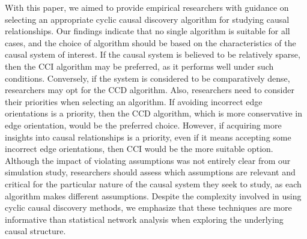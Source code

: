 \documentclass[twoside, 11pt]{article}
\begin{document}
With this paper, we aimed to provide empirical researchers with guidance on selecting an appropriate cyclic causal discovery algorithm for studying causal relationships. 
Our findings indicate that no single algorithm is suitable for all cases, and the choice of algorithm should be based on the characteristics of the causal system of interest. 
If the causal system is believed to be relatively sparse, then the CCI algorithm may be preferred, as it performs well under such conditions. Conversely, if the system is considered to be comparatively dense, researchers may opt for the CCD algorithm.
Also, researchers need to consider their priorities when selecting an algorithm. If avoiding incorrect edge orientations is a priority, then the CCD algorithm, which is more conservative in edge orientation, would be the preferred choice. However, if acquiring more insights into causal relationships is a priority, even if it means accepting some incorrect edge orientations, then CCI would be the more suitable option. Although the impact of violating assumptions was not entirely clear from our simulation study, researchers should assess which assumptions are relevant and critical for the particular nature of the causal system they seek to study, as each algorithm makes different assumptions. Despite the complexity involved in using cyclic causal discovery methods, we emphasize that these techniques are more informative than statistical network analysis when exploring the underlying causal structure. 

\end{document}
